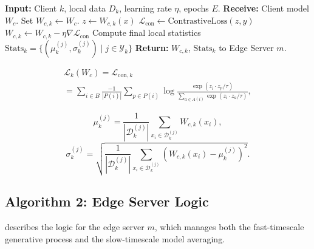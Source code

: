 \begin{algorithm}[!ht]
    \caption{H-SFP: Client-Side Training}
    \label{alg:client}
    \begin{algorithmic}[1]
    \State \textbf{Input:} Client $k$, local data $D_k$, learning rate $\eta$, epochs $E$.
    \State \textbf{Receive:} Client model $W_c$.
    \State Set $W_{c,k} \leftarrow W_c$.
            \State $z \leftarrow W_{c,k}(x)$ 
            \State $\mathcal{L}_{\text{con}} \leftarrow \text{ContrastiveLoss}(z, y)$ 
            \State $W_{c,k} \leftarrow W_{c,k} - \eta \nabla \mathcal{L}_{\text{con}}$
        \EndFor
    \EndFor
    \State Compute final local statistics $\text{Stats}_k = \{(\mu_k^{(j)}, \sigma_k^{(j)}) \mid j \in \mathcal{Y}_k\}$
    \State \textbf{Return:} $W_{c,k}$, $\text{Stats}_k$ to Edge Server $m$.
    \end{algorithmic}
\end{algorithm}

\begin{multline}
        \label{eq:supcon}
        \mathcal{L}_k(W_c) = \mathcal{L}_{\text{con}, k} \\
        = \sum_{i \in B} \frac{-1}{|P(i)|} \sum_{p \in P(i)} \log \frac{\exp(z_i \cdot z_p / \tau)}{\sum_{a \in A(i)} \exp(z_i \cdot z_a / \tau)},
    \end{multline}

\begin{equation}
    \mu_k^{(j)} = \frac{1}{|\mathcal{D}_k^{(j)}|} \sum_{x_i \in \mathcal{D}_k^{(j)}} W_{c,k}(x_i),
    \label{mean_client}
\end{equation}
\begin{equation}
    \sigma_k^{(j)} = \sqrt{\frac{1}{|\mathcal{D}_k^{(j)}|} \sum_{x_i \in \mathcal{D}_k^{(j)}} (W_{c,k}(x_i) - \mu_k^{(j)})^2}.
    \label{std_client}
\end{equation}

\subsection*{Algorithm 2: Edge Server Logic}

 describes the logic for the edge server $m$, which manages both the fast-timescale generative process and the slow-timescale model averaging.

